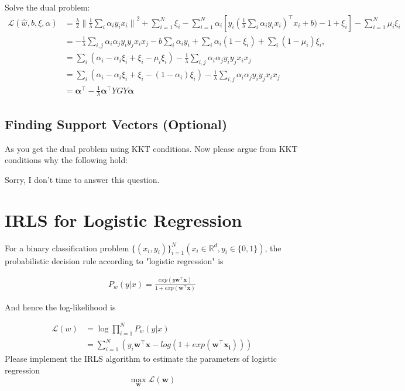 \documentclass[a4paper]{article}
\begin{document}
Solve the dual problem:
\begin{equation}
    \begin{aligned}
        \mathcal{L}(\hat{w},b,\xi,\alpha)  &=  \frac{\lambda}{2}{\| \frac{1}{\lambda} \sum_{i} \alpha_i y_i x_i \|}^2 + \sum_{i=1}^{N} \xi_i - \sum_{i=1}^{N} \alpha_i [y_i (\frac{1}{\lambda} \sum_{i} \alpha_i y_i x_i )^{\top} x_i + b) - 1+\xi_i] - \sum_{i=1}^{N} \mu_i \xi_i \\
        &= - \frac{1}{\lambda}\sum_{i,j}\alpha_i \alpha_j y_i y_j x_i x_j - b \sum_{i}\alpha_i y_i + \sum_{i}\alpha_i (1-\xi_i) + \sum_{i} (1-\mu_i)\xi_i ,\\
        &= \sum_{i}(\alpha_i -\alpha_i\xi_i +\xi_i - \mu_i \xi_i) - \frac{1}{\lambda}\sum_{i,j}\alpha_i \alpha_j y_i y_j x_i x_j \\
        &= \sum_{i}(\alpha_i -\alpha_i\xi_i +\xi_i - (1-\alpha_i) \xi_i) - \frac{1}{\lambda}\sum_{i,j}\alpha_i \alpha_j y_i y_j x_i x_j \\
        &= \pmb{\alpha}^{\top}  -  \frac{1}{\lambda} \pmb{\alpha}^{\top} Y G Y \pmb{\alpha}
    \end{aligned}
\end{equation}


\subsection{Finding Support Vectors (Optional)}
As you get the dual problem using KKT conditions. Now please argue from KKT conditions why the following hold:

Sorry, I don't time to answer this question.

\section{IRLS for Logistic Regression}

For a binary classification problem $\{(x_i , y_i )\}^{N}_{i=1} (x_i \in \mathbb{R}^d , y_i \in \{0, 1\})$, the probabilistic decision rule according to "logistic regression" is

\begin{equation}
    \begin{aligned}
        P_w(y|x) = \frac{exp(y\pmb{w}^{\top}\pmb{x})}{1+exp(\pmb{w}^{\top}\pmb{x})}
    \end{aligned}
\end{equation}

And hence the log-likelihood is

\begin{equation}
    \begin{aligned}
        \mathcal{L}(w) &= \log \prod_{i=1}^{N} P_w(y|x) \\
        &= \sum_{i=1}^{N}(y_i\pmb{w}^{\top}\pmb{x} - log(1+exp(\pmb{w}^{\top}\pmb{x_i})))
    \end{aligned}
\end{equation}
Please implement the IRLS algorithm to estimate the parameters of logistic regression
\begin{equation}
    \max_{\pmb{w} }\mathcal{L(\pmb{w})}
\end{equation}
\end{document}
